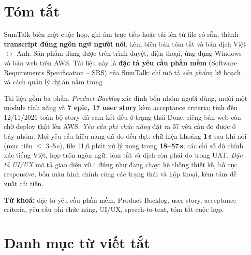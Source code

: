 \documentclass[12pt,a4paper]{report}
\begin{document}
\tableofcontents

\chapter*{Tóm tắt}

SumTalk biến một cuộc họp, ghi âm trực tiếp hoặc tải lên từ file có sẵn, thành \textbf{transcript đúng ngôn ngữ
người nói}, kèm biên bản tóm tắt và bản dịch Việt $\leftrightarrow$ Anh. Sản phẩm dùng được trên trình duyệt,
điện thoại, ứng dụng Windows và bản web trên AWS. Tài liệu này là \textbf{đặc tả yêu cầu phần mềm} (Software
Requirements Specification -- SRS) của SumTalk: chỉ mô tả \emph{sản phẩm}; kế hoạch và cách quản lý dự án nằm
trong ~\cite{pmp}.

Tài liệu gồm ba phần. \emph{Product Backlog} xác định bốn nhóm người dùng, mười một module tính năng và
\textbf{7 epic, 17 user story} kèm acceptance criteria; tính đến 12/11/2026 toàn bộ story đã cam kết đều ở trạng
thái Done, riêng bản web còn chờ deploy thật lên AWS. \emph{Yêu cầu phi chức năng} đặt ra 37 yêu cầu đo được ở
bảy nhóm. Mọi yêu cầu hiệu năng đã đo đều đạt: chữ hiện khoảng \textbf{1\,s} sau khi nói (mục tiêu
$\leq$ 3--5\,s), file 11,6 phút xử lý xong trong \textbf{18--57\,s}; các chỉ số độ chính xác tiếng Việt, họp trộn
ngôn ngữ, tóm tắt và dịch còn phải đo trong UAT. \emph{Đặc tả UI/UX} mô tả giao diện v0.4 đúng như đang chạy:
hệ thống thiết kế, bố cục responsive, bốn màn hình chính cùng các trạng thái và hộp thoại, kèm tám đề xuất cải
tiến.

\textbf{Từ khoá:} đặc tả yêu cầu phần mềm, Product Backlog, user story, acceptance criteria, yêu cầu phi chức
năng, UI/UX, speech-to-text, tóm tắt cuộc họp.

\chapter*{Danh mục từ viết tắt}
\end{document}

